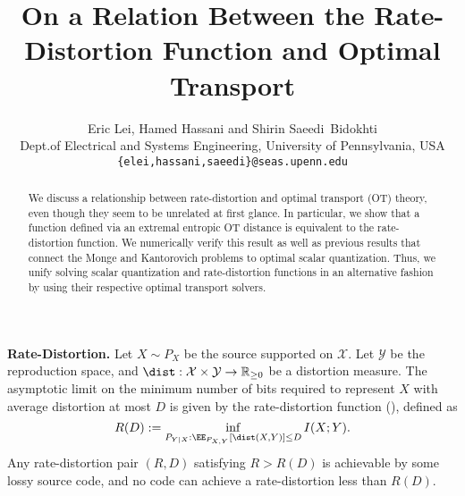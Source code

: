 \documentclass{article} %
\title{On a Relation Between the Rate-Distortion Function and Optimal Transport}
\author{Eric Lei, Hamed Hassani and Shirin Saeedi~Bidokhti \\
Dept.\@ of Electrical and Systems Engineering, University of Pennsylvania, USA\\
\texttt{\{elei,hassani,saeedi\}@seas.upenn.edu} \\
}
\begin{document}
\maketitle

\begin{abstract}
    We discuss a relationship between rate-distortion and optimal transport (OT) theory, even though they seem to be unrelated at first glance. In particular, we show that a function defined via an extremal entropic OT distance is equivalent to the rate-distortion function. We numerically verify this result as well as previous results that connect the Monge and Kantorovich problems to optimal scalar quantization. Thus, we unify solving scalar quantization and rate-distortion functions in an alternative fashion by using their respective optimal transport solvers.
\end{abstract}


    \textbf{Rate-Distortion.} Let $X \sim P_X$ be the source supported on $\mathcal{X}$. Let $\mathcal{Y}$ be the reproduction space, and $\dist: \mathcal{X} \times \mathcal{Y} \rightarrow \mathbb{R}_{\geq 0}$ be a distortion measure. The asymptotic limit on the minimum number of bits required to represent $X$ with average distortion at most $D$ is given by the rate-distortion function (\cite{CoverThomas}),  defined as
        \begin{equation}
    	    R(D) := \inf_{\substack{P_{Y|X}:  \EE_{P_{X,Y}}[\dist(X,Y)]  \leq D}} I(X;Y). 
    	    \label{eq:RD}
    	\end{equation} 
    Any rate-distortion pair $(R,D)$ satisfying $R > R(D)$ is achievable by some lossy source code, and no code can achieve a rate-distortion less than $R(D)$. 
    
\end{document}
